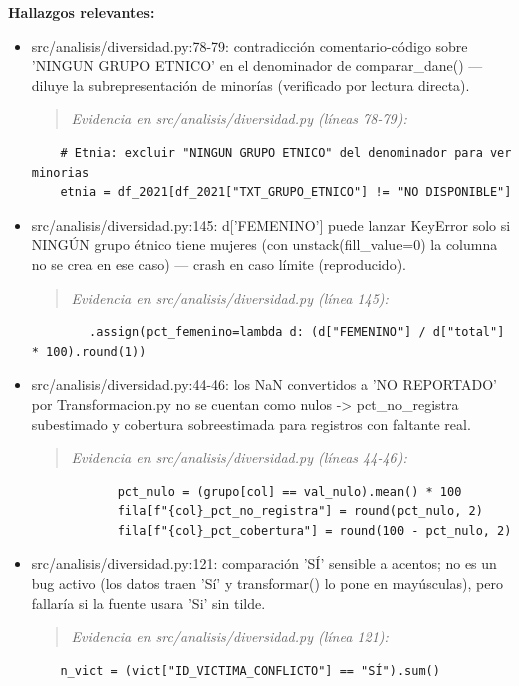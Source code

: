 \textbf{Hallazgos relevantes:}
\begin{itemize}
  \item src/analisis/diversidad.py:78-79: contradicción comentario-código sobre 'NINGUN GRUPO ETNICO' en el denominador de comparar\_dane() --- diluye la subrepresentación de minorías (verificado por lectura directa).
\begin{quote}\footnotesize\ttfamily
\noindent\emph{Evidencia en src/analisis/diversidad.py (líneas 78-79):}
\end{quote}
\begin{lstlisting}
    # Etnia: excluir "NINGUN GRUPO ETNICO" del denominador para ver minorias
    etnia = df_2021[df_2021["TXT_GRUPO_ETNICO"] != "NO DISPONIBLE"]
\end{lstlisting}

  \item src/analisis/diversidad.py:145: d['FEMENINO'] puede lanzar KeyError solo si NINGÚN grupo étnico tiene mujeres (con unstack(fill\_value=0) la columna no se crea en ese caso) --- crash en caso límite (reproducido).
\begin{quote}\footnotesize\ttfamily
\noindent\emph{Evidencia en src/analisis/diversidad.py (línea 145):}
\end{quote}
\begin{lstlisting}
        .assign(pct_femenino=lambda d: (d["FEMENINO"] / d["total"] * 100).round(1))
\end{lstlisting}

  \item src/analisis/diversidad.py:44-46: los NaN convertidos a 'NO REPORTADO' por Transformacion.py no se cuentan como nulos -> pct\_no\_registra subestimado y cobertura sobreestimada para registros con faltante real.
\begin{quote}\footnotesize\ttfamily
\noindent\emph{Evidencia en src/analisis/diversidad.py (líneas 44-46):}
\end{quote}
\begin{lstlisting}
            pct_nulo = (grupo[col] == val_nulo).mean() * 100
            fila[f"{col}_pct_no_registra"] = round(pct_nulo, 2)
            fila[f"{col}_pct_cobertura"] = round(100 - pct_nulo, 2)
\end{lstlisting}

  \item src/analisis/diversidad.py:121: comparación 'SÍ' sensible a acentos; no es un bug activo (los datos traen 'Sí' y transformar() lo pone en mayúsculas), pero fallaría si la fuente usara 'Si' sin tilde.
\begin{quote}\footnotesize\ttfamily
\noindent\emph{Evidencia en src/analisis/diversidad.py (línea 121):}
\end{quote}
\begin{lstlisting}
    n_vict = (vict["ID_VICTIMA_CONFLICTO"] == "SÍ").sum()
\end{lstlisting}

\end{itemize}

